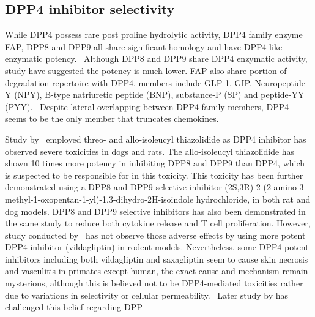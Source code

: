 \subsection{DPP4 inhibitor selectivity}
While DPP4 possess rare post proline hydrolytic activity, DPP4 family enzyme FAP, DPP8 and DPP9 all share significant homology and have DPP4-like enzymatic potency.~\cite{Kirby_2010,Thornberry_2007} Although DPP8 and DPP9 share DPP4 enzymatic activity, study have suggested the potency is much lower. FAP also share portion of degradation repertoire with DPP4, members include GLP-1, GIP, Neuropeptide-Y (NPY), B-type natriuretic peptide (BNP), substance-P (SP) and peptide-YY (PYY).~\cite{Keane_2011} Despite lateral overlapping between DPP4 family members, DPP4 seems to be the only member that truncates chemokines.~\cite{Keane_2011}  
\par 
Study by~\citet{Lankas2005} employed threo- and allo-isoleucyl thiazolidide as DPP4 inhibitor has observed severe toxicities in dogs and rats. The allo-isoleucyl thiazolidide has shown 10 times more potency in inhibiting DPP8 and DPP9 than DPP4, which is suspected to be responsible for in this toxicity. This toxicity has been further demonstrated using a DPP8 and DPP9 selective inhibitor (2S,3R)-2-(2-amino-3-methyl-1-oxopentan-1-yl)-1,3-dihydro-2H-isoindole hydrochloride, in both rat and dog models. DPP8 and DPP9 selective inhibitors has also been demonstrated in the same study to reduce both cytokine release and T cell proliferation. However, study conducted by~\citet{Burkey2008} has not observe those adverse effects by using more potent DPP4 inhibitor (vildagliptin) in rodent models. Nevertheless, some DPP4 potent inhibitors including both vildagliptin and saxagliptin seem to cause skin necrosis and vasculitis in primates except human, the exact cause and mechanism remain mysterious, although this is believed not to be DPP4-mediated toxicities rather due to variations in selectivity or cellular permeability.~\cite{Hoffmann2014} Later study by \citet{Bank2011} has challenged this belief regarding DPP
\par 